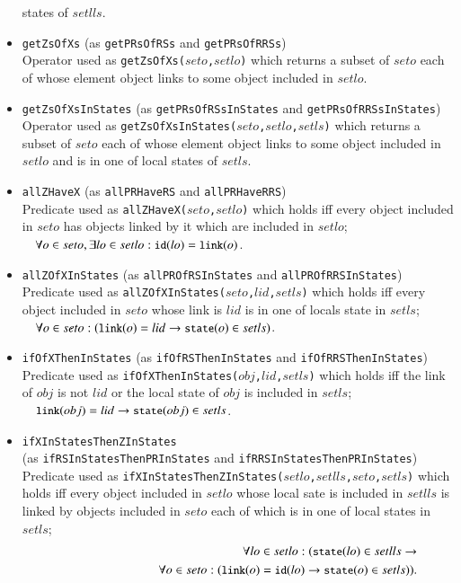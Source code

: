 \documentclass[12pt]{report}
\newcommand{\ra}{\rightarrow}
\newcommand{\mbstt}[1]{\mbox{\small{\tt {#1}}}}
\newcommand{\stt}[1]{{\small{\tt {#1}}}}
\begin{document}
\begin{itemize}
  states of $setlls$.
\item \stt{getZsOfXs} (as \stt{getPRsOfRSs} and \stt{getPRsOfRRSs})\\
  Operator used as \stt{getZsOfXs($seto$,$setlo$)} which returns a
  subset of $seto$ each of whose element object links to some object
  included in $setlo$.
\item \stt{getZsOfXsInStates} (as \stt{getPRsOfRSsInStates} and \stt{getPRsOfRRSsInStates})\\
  Operator used as \stt{getZsOfXsInStates($seto$,$setlo$,$setls$)}
  which returns a subset of $seto$ each of whose element object links
  to some object included in $setlo$ and is in one of local states of
  $setls$.
\item \stt{allZHaveX} (as \stt{allPRHaveRS} and \stt{allPRHaveRRS})\\
  Predicate used as \stt{allZHaveX($seto$,$setlo$)} which holds iff
  every object included in $seto$ has objects linked by it
  which are included in $setlo$;\\$~~~~\forall o\in seto,\exists lo\in
  setlo:\mbstt{id}(lo)=\mbstt{link}(o)$.
\item \stt{allZOfXInStates} (as \stt{allPROfRSInStates} and \stt{allPROfRRSInStates})\\
  Predicate used as \stt{allZOfXInStates($seto$,$lid$,$setls$)} which
  holds iff every object included in $seto$ whose link is $lid$
  is in one of locals state in $setls$;\\$~~~~\forall o\in
  seto:(\mbstt{link}(o)=lid\ra\mbstt{state}(o)\in setls)$.
\item \stt{ifOfXThenInStates} (as \stt{ifOfRSThenInStates} and \stt{ifOfRRSThenInStates})\\
  Predicate used as \stt{ifOfXThenInStates($obj$,$lid$,$setls$)} which
  holds iff the link of $obj$ is not $lid$ or the local state of
  $obj$ is included in
  $setls$;\\$~~~~\mbstt{link}(obj)=lid\ra\mbstt{state}(obj)\in setls$.
\item \stt{ifXInStatesThenZInStates}\\
(as \stt{ifRSInStatesThenPRInStates} and \stt{ifRRSInStatesThenPRInStates})\\
  Predicate used as
  \stt{ifXInStatesThenZInStates($setlo$,$setlls$,$seto$,$setls$)}
  which holds iff every object included in $setlo$ whose local
  sate is included in $setlls$ is linked by objects included in $seto$
  each of which is in one of local states in $setls$;
  \vspace{-0.3cm}
  \begin{eqnarray*}
    &&\forall lo\in setlo:(\mbstt{state}(lo)\in setlls\ra\\
    &&~~~~~~~~~~~~~~~~~~~~~~~~~~~~
    \forall o\in seto: (\mbstt{link}(o)=\mbstt{id}(lo)\ra\mbstt{state}(o)\in setls)).
  \end{eqnarray*}
\end{itemize}
\end{document}
